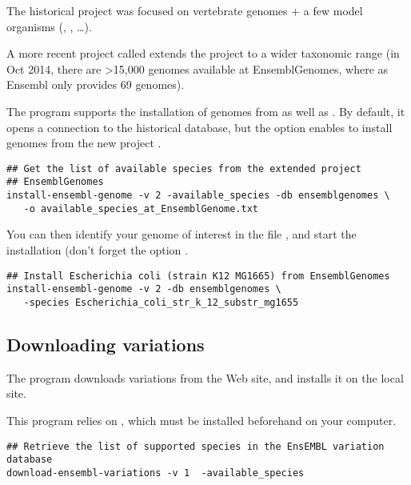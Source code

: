 The historical \ensembl project 
was focused on vertebrate genomes + a few model organisms
(, ,
\ldots).

A more recent project called \ensemblgenomes
{} extends the \ensembl project to a
wider taxonomic range (in Oct 2014, there are >15,000 genomes
available at EnsemblGenomes, where as Ensembl only provides 69
genomes).

The program  supports the installation
of genomes from \ensembl as well as \ensemblgenomes. By default, it
opens a connection to the historical \ensembl database, but the option
 enables to install genomes from the new
project \ensemblgenomes.

\begin{lstlisting}
## Get the list of available species from the extended project
## EnsemblGenomes
install-ensembl-genome -v 2 -available_species -db ensemblgenomes \
   -o available_species_at_EnsemblGenome.txt
\end{lstlisting}

You can then identify your genome of interest in the file
, and start the
installation (don't forget the option .

\begin{lstlisting}
## Install Escherichia coli (strain K12 MG1665) from EnsemblGenomes
install-ensembl-genome -v 2 -db ensemblgenomes \
   -species Escherichia_coli_str_k_12_substr_mg1655
\end{lstlisting}


\subsection{Downloading variations}
\label{sect:download_ensembl_variations}

The program  downloads variations
from the \ensembl Web site, and installs it on the local \RSAT
site. 

This program relies on , which must be installed
beforehand on your computer.

\begin{lstlisting}
## Retrieve the list of supported species in the EnsEMBL variation database
download-ensembl-variations -v 1  -available_species
\end{lstlisting}

